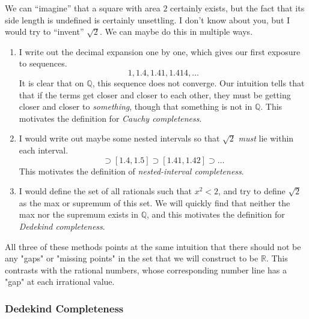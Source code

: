     We can ``imagine'' that a square with area $2$ certainly exists, but the fact that its side length is undefined is certainly unsettling. I don't know about you, but I would try to ``invent'' $\sqrt{2}$. We can maybe do this in multiple ways. 
    \begin{enumerate}
      \item I write out the decimal expansion one by one, which gives our first exposure to sequences. 
      \begin{equation}
        1, 1.4, 1.41, 1.414, \ldots
      \end{equation} 
      It is clear that on $\mathbb{Q}$, this sequence does not converge. Our intuition tells that that if the terms get closer and closer to each other, they must be getting closer and closer to \textit{something}, though that something is not in $\mathbb{Q}$. This motivates the definition for \textit{Cauchy completeness}. 

      \item I would write out maybe some nested intervals so that $\sqrt{2}$ \textit{must}  lie within each interval. 
      \begin{equation}
        [1, 2] \supset [1.4, 1.5] \supset [1.41, 1.42] \supset \ldots 
      \end{equation}
      This motivates the definition of \textit{nested-interval completeness}. 

      \item I would define the set of all rationals such that $x^2 < 2$, and try to define $\sqrt{2}$ as the max or supremum of this set. We will quickly find that neither the max nor the supremum exists in $\mathbb{Q}$, and this motivates the definition for \textit{Dedekind completeness}. 
    \end{enumerate}

    All three of these methods points at the same intuition that there should not be any "gaps" or "missing points" in the set that we will construct to be $\mathbb{R}$. This contrasts with the rational numbers, whose corresponding number line has a "gap" at each irrational value. 

  \subsubsection{Dedekind Completeness} 

